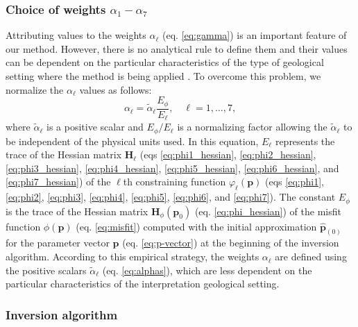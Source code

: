 \subsubsection{Choice of weights $\alpha_{1}-\alpha_{7}$}

Attributing values to the weights $ \alpha_{\ell} $ (eq. \ref{eq:gamma}) is an important feature of our method. 
However, there is no analytical rule to define them and their values can be dependent on the particular characteristics of the type of geological setting where the method is being applied \cite{silva-2001}. 
To overcome this problem, we normalize the $ \alpha_{\ell} $ 
values as follows:
\begin{equation}\label{eq:alphas}
\alpha_{\ell} = \tilde{\alpha}_\ell \frac{E_\phi}{E_\ell}, \quad \ell = 1,\dots, 7,
\end{equation}
where $\tilde{\alpha}_\ell$ is a positive scalar and $ E_\phi/E_\ell $ is a normalizing
factor allowing the $\tilde{\alpha}_\ell$ to be independent of the physical units used.
In this equation, $ E_\ell $ represents the 
trace of the Hessian matrix $\mathbf{H}_{\ell}$ (eqs \ref{eq:phi1_hessian}, 
\ref{eq:phi2_hessian}, \ref{eq:phi3_hessian}, \ref{eq:phi4_hessian}, \ref{eq:phi5_hessian}, 
\ref{eq:phi6_hessian}, and \ref{eq:phi7_hessian}) of the $\ell$th constraining function 
$\varphi_{\ell}(\mathbf{p})$ (eqs \ref{eq:phi1}, \ref{eq:phi2}, \ref{eq:phi3}, 
\ref{eq:phi4}, \ref{eq:phi5}, \ref{eq:phi6}, and \ref{eq:phi7}). 
The constant $E_\phi$ is the trace of the Hessian matrix 
$\mathbf{H}_{\phi}(\mathbf{p}_{0})$ (eq. \ref{eq:phi_hessian}) of the misfit function 
$\phi(\mathbf{p})$ (eq. \ref{eq:misfit}) computed with the initial approximation $\hat{\mathbf{p}}_{(0)}$ 
for the parameter vector $ \mathbf{p} $ (eq. \ref{eq:p-vector}) at the beginning of the inversion algorithm. According to this empirical strategy, the weights $ \alpha_{\ell} $ are defined using the positive scalars $\tilde{\alpha}_\ell$ (eq. \ref{eq:alphas}), which are less dependent on the particular characteristics of the interpretation geological setting.

\subsubsection{Inversion algorithm}

